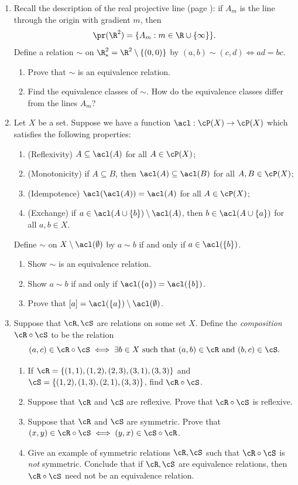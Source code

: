 \begin{enumerate}
	\item Recall the description of the real projective line (page \pageref{ex:projline}): if $A_m$ is the line through the origin with gradient $m$, then
	\[\pr(\R^2)=\{A_m:m\in\R\cup\{\infty\}\}.\]
	Define a relation $\sim$ on $\R^2_*=\R^2\setminus\{(0,0)\}$ by $(a,b)\sim(c,d)\iff ad=bc$.
	\begin{enumerate}
	  \item Prove that $\sim$ is an equivalence relation.
	  \item Find the equivalence classes of $\sim$. How do the equivalence classes differ from the lines $A_m$?
	\end{enumerate}
	
	\item Let $X$ be a set. Suppose we have a function $\acl : \cP(X) \to \cP(X)$ which satisfies the following properties:
\begin{enumerate}[label=(\roman*)]
    \item (Reflexivity) $A \subseteq \acl(A)$ for all $A \in \cP(X)$;
    \item (Monotonicity) if $A \subseteq B$, then $\acl(A) \subseteq \acl(B)$ for all $A,B \in \cP(X)$;
    \item (Idempotence) $\acl(\acl(A)) = \acl(A)$ for all $A \in \cP(X)$;
    \item (Exchange) if $a \in \acl(A \cup \{b\}) \setminus \acl(A)$, then $b \in \acl(A \cup \{a\})$ for all $a,b \in X$.
\end{enumerate}
Define $\sim$ on $X \setminus \acl(\emptyset)$ by $a \sim b$ if and only if $a \in \acl(\{b\})$. 
\begin{enumerate}
    \item Show $\sim$ is an equivalence relation.
    \item Show $a \sim b$ if and only if $\acl(\{a\}) = \acl(\{b\})$.
    \item Prove that $[a] = \acl(\{a\}) \setminus \acl(\emptyset)$.
\end{enumerate}
  
	\item Suppose that $\cR,\cS$ are relations on some set $X$. Define the \emph{composition} $\cR\circ \cS$ to be the relation
	\[(a,c)\in \cR\circ \cS\iff \exists b\in X\text{ such that }(a,b)\in \cR\text{ and }(b,c)\in \cS.\]
	\begin{enumerate}
		\item If $\cR=\{(1,1),(1,2),(2,3),(3,1),(3,3)\}$ and $\cS=\{(1,2),(1,3),(2,1),(3,3)\}$, find $\cR\circ \cS$.
		\item Suppose that $\cR$ and $\cS$ are reflexive. Prove that $\cR\circ \cS$ is reflexive.
		\item Suppose that $\cR$ and $\cS$ are symmetric. Prove that $(x,y)\in \cR\circ \cS\iff (y,x)\in \cS\circ \cR$.
		\item Give an example of symmetric relations $\cR,\cS$ such that $\cR\circ \cS$ is \emph{not} symmetric. Conclude that if $\cR,\cS$ are equivalence relations, then $\cR\circ \cS$ need not be an equivalence relation.
	\end{enumerate}
	

\end{enumerate}
